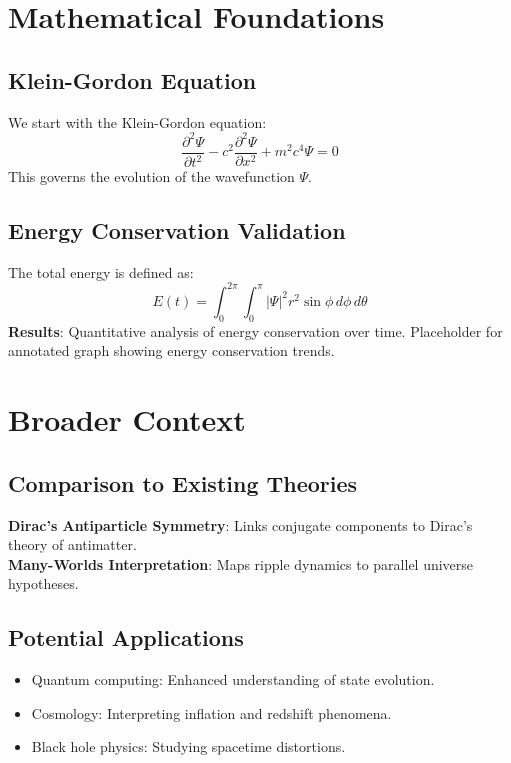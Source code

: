 \documentclass[12pt]{article}
\begin{document}
\section{Mathematical Foundations}
\subsection{Klein-Gordon Equation}
We start with the Klein-Gordon equation:
\begin{equation}
\frac{\partial^2 \Psi}{\partial t^2} - c^2 \frac{\partial^2 \Psi}{\partial x^2} + m^2 c^4 \Psi = 0
\end{equation}
This governs the evolution of the wavefunction \(\Psi\).

\subsection{Energy Conservation Validation}
The total energy is defined as:
\begin{equation}
E(t) = \int_{0}^{2\pi} \int_{0}^{\pi} |\Psi|^2 r^2 \sin\phi \, d\phi \, d\theta
\end{equation}
\textbf{Results}: Quantitative analysis of energy conservation over time. Placeholder for annotated graph showing energy conservation trends.

\section{Broader Context}
\subsection{Comparison to Existing Theories}
\textbf{Dirac’s Antiparticle Symmetry}: Links conjugate components to Dirac’s theory of antimatter. \\
\textbf{Many-Worlds Interpretation}: Maps ripple dynamics to parallel universe hypotheses.

\subsection{Potential Applications}
\begin{itemize}
    \item Quantum computing: Enhanced understanding of state evolution.
    \item Cosmology: Interpreting inflation and redshift phenomena.
    \item Black hole physics: Studying spacetime distortions.
\end{itemize}
\end{document}
